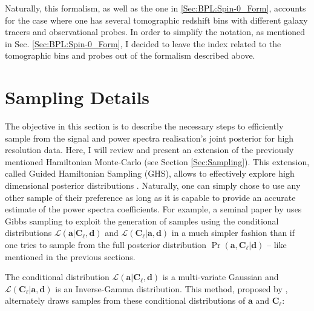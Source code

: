 \qquad Naturally, this formalism, as well as the one in \ref{Sec:BPL:Spin-0_Form}, accounts for the case where one has several tomographic redshift bins with different galaxy tracers and observational probes. In order to simplify the notation, as mentioned in Sec. \ref{Sec:BPL:Spin-0_Form}, I decided to leave the index related to the tomographic bins and probes out of the formalism described above.

\section{Sampling Details}\label{Sec:BPL:Sampling}
The objective in this section is to describe the necessary steps to efficiently sample from the signal and power spectra realisation's joint posterior for high resolution data. Here, I will review and present an extension of the previously mentioned Hamiltonian Monte-Carlo (see Section \ref{Sec:Sampling}). This extension, called Guided Hamiltonian Sampling (GHS), allows to effectively explore high dimensional posterior distributions \citep{SreeThesis,2013-GuidedHamiltonian}. Naturally, one can simply chose to use any other sample of their preference as long as it is capable to provide an accurate estimate of the power spectra coefficients. For example, a seminal paper by \cite{Wandelt2004} uses Gibbs sampling \citep{Geman1984,Casella1992} to exploit the generation of samples using the conditional distributions $\mathcal{L}(\mathbf{a}|\textbf{C}_{\ell},\mathbf{d})$ and $\mathcal{L}(\textbf{C}_{\ell}|\mathbf{a},\mathbf{d})$ in a much simpler fashion than if one tries to sample from the full posterior distribution $\Pr(\mathbf{a},\textbf{C}_{\ell}|\mathbf{d})$ -- like mentioned in the previous sections.

\qquad The conditional distribution $\mathcal{L}(\mathbf{a}|\textbf{C}_{\ell},\mathbf{d})$ is a multi-variate Gaussian and $\mathcal{L}(\textbf{C}_{\ell}|\mathbf{a},\mathbf{d})$ is an Inverse-Gamma distribution. This method, proposed by \cite{Wandelt2004}, alternately draws samples from these conditional distributions of $\mathbf{a}$ and $\textbf{C}_{\ell}$:

